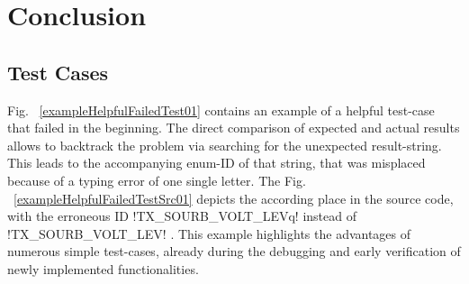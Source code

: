 	\chapter{Conclusion}
	\label{cha:Conclusion}
	\section{Test Cases}
	Fig. ~\ref{exampleHelpfulFailedTest01} contains an example of a helpful test-case that failed in the beginning. The direct comparison of expected and actual results allows to backtrack the problem via searching for the unexpected result-string. This leads to the accompanying enum-ID of that string, that was misplaced because of a typing error of one single letter. 
	The Fig. ~\ref{exampleHelpfulFailedTestSrc01} depicts the according place in the source code, with the erroneous ID \lstC !TX_SOURB_VOLT_LEVq! instead of \lstC !TX_SOURB_VOLT_LEV! .
	This example highlights the advantages of numerous simple test-cases, already during the debugging and early verification of newly implemented functionalities.
